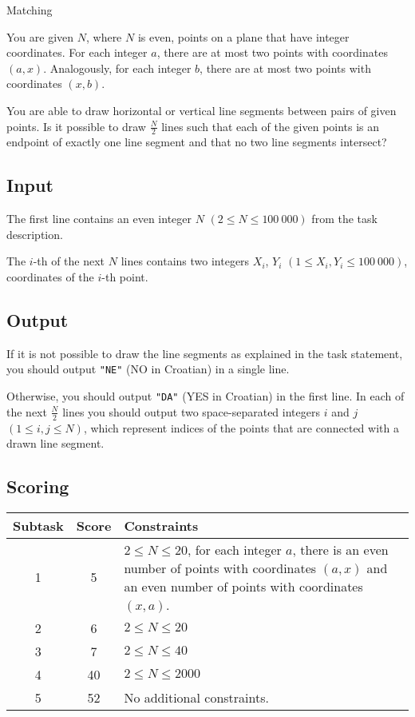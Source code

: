 \begin{statement}[
  problempoints=110,
  timelimit=? seconds,
  memorylimit=512 MiB,
]{Matching}

You are given $N$, where $N$ is even, points on a plane that have integer
coordinates. For each integer $a$, there are at most two points with coordinates
$(a, x)$. Analogously, for each integer $b$, there are at most two points
with coordinates $(x, b)$.

You are able to draw horizontal or vertical line segments between pairs of given
points. Is it possible to draw $\frac{N}{2}$ lines such that each of the
given points is an endpoint of exactly one line segment and that no two line
segments intersect?

\subsection*{Input}
The first line contains an even integer $N$ $(2 \le N \le 100\ 000)$ from
the task description.

The $i$-th of the next $N$ lines contains two integers $X_i$, $Y_i$
$(1 \le X_i, Y_i \le 100\ 000)$, coordinates of the $i$-th point.

\subsection*{Output}
If it is not possible to draw the line segments as explained in the task
statement, you should output \texttt{"NE"} (NO in Croatian) in a single line.

Otherwise, you should output \texttt{"DA"} (YES in Croatian) in the first
line. In each of the next $\frac{N}{2}$ lines you should output two
space-separated integers $i$ and $j$ $(1 \le i, j \le N)$, which represent
indices of the points that are connected with a drawn line segment.

 \subsection*{Scoring}
{\renewcommand{\arraystretch}{1.4}
  \setlength{\tabcolsep}{6pt}
  \begin{tabular}{ccl}
 Subtask & Score & Constraints \\ \midrule
    1 & 5 &   \makecell[l]{$2 \le N \le 20$, for each integer $a$, there is an even
              number of points with coordinates $(a, x)$ \\ and an even number
              of points with coordinates
              $(x, a)$. } \\
  2 & 6 & $2 \le N \le 20$ \\
  3 & 7 & $2 \le N \le 40$ \\
  4 & 40 & $2 \le N \le 2000$ \\
  5 & 52 & No additional constraints.
\end{tabular}}


\end{statement}
